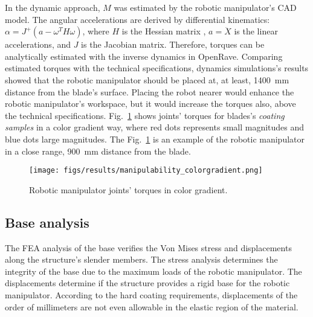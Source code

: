 In the dynamic approach, $M$ was estimated by the robotic manipulator's CAD
model. The angular accelerations are derived by differential kinematics:
$\alpha=J^+(a-\omega^TH\omega)$, where $H$ is the Hessian matrix
\cite{hourtash2005kinematic}, $a=\ddot{X}$ is the linear accelerations, and $J$
is the Jacobian matrix. Therefore, torques can be analytically estimated with
the inverse dynamics in OpenRave. Comparing estimated torques with the technical
specifications, dynamics simulations's results showed that the robotic
manipulator should be placed at, at least, 1400~mm distance from the blade's
surface. Placing the robot nearer would enhance the robotic manipulator's
workspace, but it would increase the torques also, above the technical
specifications. Fig.~\ref{fig:torques} shows joints' torques for blades's
\textit{coating samples} in a color gradient way, where red dots represents
small magnitudes and blue dots large magnitudes. The Fig.~\ref{fig:torques} is
an example of the robotic manipulator in a close range, 900~mm distance from the
blade.

\begin{figure}
	\centering
	\texttt{[image: figs/results/manipulability\_colorgradient.png]}
    \caption{Robotic manipulator joints' torques in color gradient.}
    \label{fig:torques}
\end{figure}

\subsection{Base analysis}

The FEA analysis of the base verifies the Von Mises stress and displacements
along the structure's slender members. The stress analysis determines the
integrity of the base due to the maximum loads of the robotic manipulator. The
displacements determine if the structure provides a rigid base for the robotic
manipulator. According to the hard coating requirements, displacements of the
order of millimeters are not even allowable in the elastic region of the
material.



